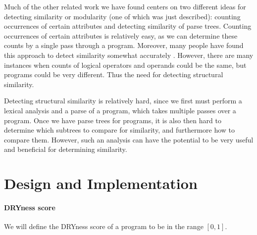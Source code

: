 \documentclass{article}
\begin{document}
Much of the other related work we have found centers on two different ideas for detecting similarity or modularity
(one of which was just described): counting occurrences
of certain attributes and detecting similarity of parse trees. Counting occurrences of certain attributes is relatively easy, as we can
determine these counts by a single pass through a program. Moreover, many people have found this approach to detect similarity 
somewhat accurately \cite{Modularity1979}\cite{PlagiarismProgrammingAssignments}. However, there are many instances when counts of
logical operators and operands could be the same, but programs could be very different. Thus the need for detecting structural similarity.

Detecting structural similarity is relatively hard, since we first must perform a lexical analysis and a parse of a program, which takes
multiple passes over a program. Once we have parse trees for programs, it is also then hard to determine which subtrees to compare for
similarity, and furthermore how to compare them. However, such an analysis can have the potential to be very useful and beneficial
for determining similarity\cite{ProgramSimilarityPopulations}\cite{PlagiarismProgrammingAssignments}.

\section{Design and Implementation}

\paragraph{DRYness score}

We will define the DRYness score of a program to be in the range $[0,1]$. 
\end{document}
